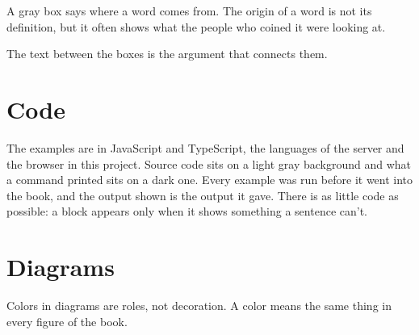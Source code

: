 \begin{etymology}
A gray box says where a word comes from. The origin of a word is not its
definition, but it often shows what the people who coined it were looking at.
\end{etymology}

The text between the boxes is the argument that connects them.

\section*{Code}

The examples are in JavaScript and TypeScript, the languages of the server and
the browser in this project. Source code sits on a light gray background and
what a command printed sits on a dark one. Every example was run before it went
into the book, and the output shown is the output it gave. There is as little
code as possible: a block appears only when it shows something a sentence
can't.

\section*{Diagrams}

Colors in diagrams are roles, not decoration. A color means the same thing in
every figure of the book.

